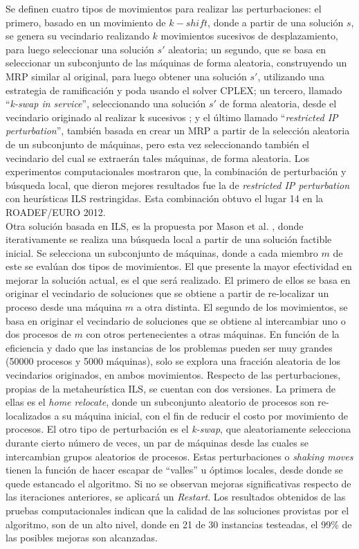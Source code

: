 Se definen cuatro tipos de movimientos para realizar las perturbaciones: 
el primero, basado en un movimiento de $k-shift$, donde a partir de una solución $s$, se genera su vecindario realizando $k$ movimientos sucesivos de desplazamiento, para luego seleccionar una solución $s'$ aleatoria; un segundo, que se basa en seleccionar un subconjunto de las máquinas de forma aleatoria, construyendo un MRP similar al original, para luego obtener una solución $s'$, utilizando una estrategia de ramificación y poda usando el solver CPLEX; un tercero, llamado ``\textit{k-swap in service}'', seleccionando una solución $s'$ de forma aleatoria, desde el vecindario originado al realizar k sucesivos ; y el último llamado ``\textit{restricted IP perturbation}'', también basada en crear un MRP a partir de la selección aleatoria de un subconjunto de máquinas, pero esta vez seleccionando también el vecindario del cual se extraerán tales máquinas, de forma aleatoria.
Los experimentos computacionales mostraron que, la combinación de perturbación y búsqueda local, que dieron mejores resultados fue la de \textit{restricted IP perturbation} con heurísticas ILS restringidas. Esta combinación obtuvo el lugar 14 en la ROADEF/EURO 2012. \\

Otra solución basada en ILS, es la propuesta por Mason et al. \cite{masson2013iterated}, donde iterativamente se realiza una búsqueda local a partir de una solución factible inicial. Se selecciona un subconjunto de máquinas, donde a cada miembro $m$ de este se evalúan dos tipos de movimientos. El que presente la mayor efectividad en mejorar la solución actual, es el que será realizado. El primero de ellos se basa en originar el vecindario de soluciones que se obtiene a partir de re-localizar un proceso desde una máquina $m$ a otra distinta. El segundo de los movimientos, se basa en originar el vecindario de soluciones que se obtiene al intercambiar uno o dos procesos de $m$ con otros pertenecientes a otras máquinas. En función de la eficiencia y dado que las instancias de los problemas pueden ser muy grandes (50000 procesos y 5000 máquinas), solo se explora una fracción aleatoria de los vecindarios originados, en ambos movimientos. 
Respecto de las perturbaciones, propias de la metaheurística ILS, se cuentan con dos versiones. La primera de ellas es el \textit{home relocate}, donde un subconjunto aleatorio de procesos son re-localizados a su máquina inicial, con el fin de reducir el costo por movimiento de procesos. El otro tipo de perturbación es el \textit{k-swap}, que aleatoriamente selecciona durante cierto número de veces, un par de máquinas desde las cuales se intercambian grupos aleatorios de procesos. Estas perturbaciones o \textit{shaking moves} tienen la función de hacer escapar de ``valles'' u óptimos locales, desde donde se quede estancado el algoritmo. Si no se observan mejoras significativas respecto de las iteraciones anteriores, se aplicará un \textit{Restart}. Los resultados obtenidos de las pruebas computacionales indican que la calidad de las soluciones provistas por el algoritmo, son de un alto nivel, donde en 21 de 30 instancias testeadas, el 99\% de las posibles mejoras son alcanzadas. \\

